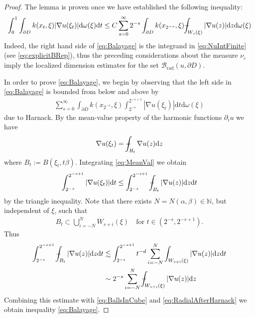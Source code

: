 \documentclass[a4paper,12pt]{article}
\theoremstyle{definition}
\theoremstyle{definition}
\def\Xint#1{\mathchoice
	{\XXint\displaystyle\textstyle{#1}}%
	{\XXint\textstyle\scriptstyle{#1}}%
	{\XXint\scriptstyle\scriptscriptstyle{#1}}%
	{\XXint\scriptscriptstyle\scriptscriptstyle{#1}}%
	\!\int}
\def\XXint#1#2#3{{\setbox0=\hbox{$#1{#2#3}{\int}$ }
		\vcenter{\hbox{$#2#3$ }}\kern-.568\wd0}}
\def\dashint{\Xint-}
\begin{document}
	\begin{proof}
		The lemma is proven once we have established the following inequality:
		\begin{align}\label{eq:Balayage}
			\int_0^1\int_{\partial D}k(x_t,\xi)|\nabla u(\xi_t)|\mathrm d\omega(\xi)\mathrm dt\leq C\sum_{s=0}^{\infty}2^{-s}\int_{\partial D}k(x_{2^{-s}},\xi)\dashint_{W_s(\xi)}|\nabla u(z)|\mathrm dz\mathrm d\omega(\xi)
		\end{align}
		Indeed, the right hand side of \eqref{eq:Balayage} is the integrand in \eqref{eq:NuIntFinite} (see \eqref{eq:explicitBRep}), thus the preceding considerations about the measure $\nu_\varepsilon$ imply the localized dimension estimates for the set $\mathcal{B}_{\mathrm{rad}}(u,\partial D)$.\par
		In order to prove \eqref{eq:Balayage}, we begin by observing that the left side in \eqref{eq:Balayage} is bounded from below and above by
		\begin{align}\label{eq:RadialAfterHarnack}
			\sum_{s=0}^{\infty}\int_{\partial D}k(x_{2^{-s}},\xi)\int_{2^{-s}}^{2^{-s+1}}|\nabla u(\xi_t)|\mathrm dt\mathrm d\omega(\xi)
		\end{align}
		due to Harnack. By the mean-value property of the harmonic functions $\partial_iu$ we have
		\begin{align}\label{eq:MeanVal}
			\nabla u(\xi_t)=\dashint_{B_t}\nabla u(z)\mathrm dz
		\end{align}
		where $B_t:=B(\xi_t,t\beta)$. Integrating \eqref{eq:MeanVal} we obtain 
		\begin{align}\label{eq:BallsInCube}
			\int_{2^{-s}}^{2^{-s+1}}|\nabla u(\xi_t)|\mathrm dt\leq\int_{2^{-s}}^{2^{-s+1}}\dashint_{B_t}|\nabla u(z)|\mathrm dz\mathrm dt
		\end{align}
		by the triangle inequality. Note that there exists $N=N(\alpha,\beta)\in\mathbb N$, but independent of $\xi$, such that
		\begin{align*}
			B_t\subset\bigcup_{i=-N}^N W_{s+i}(\xi) \quad\text{for } t\in(2^{-s},2^{-s+1}).
		\end{align*}
		Thus
		\begin{align*}
			\int_{2^{-s}}^{2^{-s+1}}\dashint_{B_t}|\nabla u(z)|\mathrm dz\mathrm dt&\lesssim \int_{2^{-s}}^{2^{-s+1}}t^{-d}\sum_{i=-N}^{N}\int_{W_{s+i}(\xi)}|\nabla u(z)|\mathrm dz\mathrm dt\\
			&\sim 2^{-s} \sum_{i=-N}^{N}\dashint_{W_{s+i}(\xi)}|\nabla u(z)|\mathrm dz
		\end{align*}
		Combining this estimate with \eqref{eq:BallsInCube} and \eqref{eq:RadialAfterHarnack} we obtain inequality \eqref{eq:Balayage}.
	\end{proof}
\end{document}
